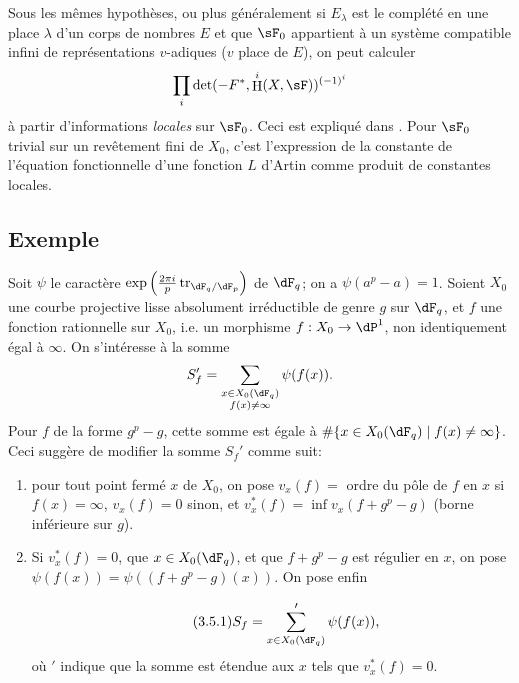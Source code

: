 \documentclass[oneside]{book}
\DeclareMathOperator{\h}{H}
\DeclareMathOperator{\tr}{tr}
\theoremstyle{sga-source}
\theoremstyle{sga-source-dash}
\theoremstyle{sga-source-dotdash}
\theoremstyle{sga-source-number-note-dash}
\theoremstyle{sga-source-note-number-dotdash}
\theoremstyle{sga-source-example-dotdash}
\theoremstyle{sga-source-inline-number}
\theoremstyle{sga-source-bare-number}
\theoremstyle{sga-source}
\newcommand{\PrintPage}[1]{}\newcommand{\MathPage}[1]{}\newcommand{\PrintCite}[2]{#1}\newcommand{\var}[3]{#2}
\begin{document}
Sous les mêmes hypothèses, ou plus généralement si $E_\lambda$ est le 
complété en une place $\lambda$ d'un corps de nombres $E$ et que $\sF_0$ 
appartient à un système compatible infini de représentations $v$-adiques 
($v$ place de $E$), on peut calculer 
\[
  \prod_i \det(-F^\ast,\h^i(X,\sF))^{(-1)^i} 
\]
à partir d'informations \emph{locales} sur $\sF_0$. Ceci est expliqué dans 
\cite{de73}. Pour $\sF_0$ trivial sur un revêtement fini de $X_0$, c'est 
l'expression de la constante de l'équation fonctionnelle d'une fonction $L$ 
d'Artin comme produit de constantes locales. 





\subsection{Exemple}\label{VI:3-5}

Soit $\psi$ le caractère 
$\exp\left(\frac{2\pi i}{p} \tr_{\dF_q/\dF_p}\right)$ de $\dF_q$; on a 
$\var{\psi(a^p-a)=0}{\psi(a^p-a)=1}{S45-SOL-0760}$. Soient $X_0$ une courbe projective lisse absolument 
irréductible de genre $g$ sur $\dF_q$, et $f$ une fonction rationnelle sur 
$X_0$, i.e. un morphisme $f:X_0 \to \dP^1$, non identiquement égal à 
$\infty$. On s'intéresse à la somme 
\[
  S_f' = \sum_{\substack{x\in X_0(\dF_q) \\ f(x)\ne \infty}} \psi(f(x)) 
  \text{.}
\]
\var{Cette somme est nulle pour $f$ de la forme $g^p-g$.}{Pour $f$ de la forme $g^p-g$, cette somme est égale à $\#\{x\in X_0(\dF_q)\mid f(x)\ne\infty\}$.}{S45-SOL-0763} Ceci suggère de 
modifier la somme $S_f'$ comme suit: 
\begin{enumerate}[\indent a)]
  \item \var{pour tout point fermé $s$}{pour tout point fermé $x$}{S45-SOL-0765} de $X_0$, on pose $v_x(f) = $ ordre du 
    \var{pole de $f$}{pôle de $f$}{S45-SOL-0766} en $x$ si $f(x)=\infty$, $v_x(f)=0$ sinon, et 
    $v_x^\ast(f) = \inf v_x(f+g^p-g)$ (borne inférieure sur $g$). 
  \item Si $v_x^\ast(f)=0$, que $x\in X_0(\dF_q)$, et que $f+g^p-g$ est 
    régulier en $x$, on pose $\psi(f(x)) = \psi((f+g^p-g)(x))$. On pose enfin 
    \PrintPage{191}
\begin{equation*}\tag{3.5.1}\label{VI:eq:3-5-1}
      S_f = \sum'_{x\in X_0(\dF_q)} \psi(f(x)) \text{,}
    \end{equation*}
    où $\prime$ indique que la somme est étendue aux $x$ tels que 
    $v_x^\ast(f)=0$. 
\end{enumerate}
\end{document}
